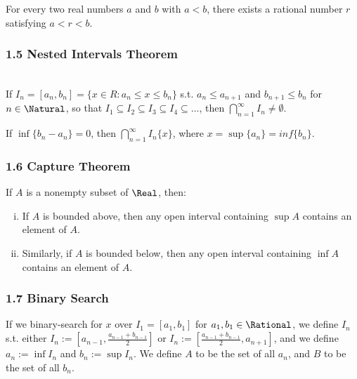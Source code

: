 \begin{theorem}
  For every two real numbers $a$ and $b$ with $a < b$, there exists a rational number $r$ satisfying $a < r < b$.
\end{theorem}

\subsubsection*{1.5 Nested Intervals Theorem}

\begin{namedtheorem} \leavevmode \\
  If $I_n = [a_n, b_n] = \{x \in R : a_n \leq x \leq b_n\}$ s.t. $a_n \leq a_{n + 1}$ and $b_{n+1} \leq b_n$ for $n \in \Natural$, so that $I_1 \subseteq I_2 \subseteq I_3 \subseteq I_4 \subseteq \ldots$, then $\displaystyle \bigcap_{n=1}^{\infty}I_n \neq \emptyset$.

  If $\inf \{b_n - a_n\} = 0$, then $\displaystyle \bigcap_{n=1}^{\infty}I_n \{x\}$, where $x = \sup \{a_n\} = inf \{ b_n \}$.
\end{namedtheorem}

\subsubsection*{1.6 Capture Theorem}

\begin{namedtheorem} If $A$ is a nonempty subset of $\Real$, then:
  \begin{enumerate}[(i)]
    \item If $A$ is bounded above, then any open interval containing $\sup A$ contains an element of $A$.
    \item Similarly, if $A$ is bounded below, then any open interval containing $\inf A$ contains an element of $A$.
  \end{enumerate}
\end{namedtheorem}

\subsubsection*{1.7 Binary Search}

If we binary-search for $x$ over $I_1 = [a_1, b_1]$ for $a_1, b_1 \in \Rational$, 
we define $I_n$ s.t. either $I_n := [a_{n-1}, \frac{a_{n-1} + b_{n-1}}{2}]$ or 
$I_n := [\frac{a_{n-1} + b_{n-1}}{2}, a_{n+1}]$, and we define $a_n := \inf I_n$ 
and $b_n := \sup I_n$. We define $A$ to be the set of all $a_n$, and $B$ to be 
the set of all $b_n$. 

